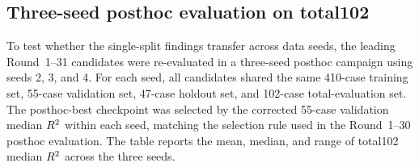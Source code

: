 ﻿\documentclass[preprint,12pt,authoryear]{elsarticle}
\newcommand{\rTwo}{R\textsuperscript{2}}
\begin{document}
\subsection{Three-seed posthoc evaluation on total102}
\label{sec:multiseedposthoc}

To test whether the single-split findings transfer across data seeds, the leading Round~1--31 candidates were re-evaluated in a three-seed posthoc campaign using seeds 2, 3, and 4.
For each seed, all candidates shared the same 410-case training set, 55-case validation set, 47-case holdout set, and 102-case total-evaluation set.
The posthoc-best checkpoint was selected by the corrected 55-case validation median $\rTwo{}$ within each seed, matching the selection rule used in the Round~1--30 posthoc evaluation.
The table reports the mean, median, and range of total102 median $\rTwo{}$ across the three seeds.
\end{document}
